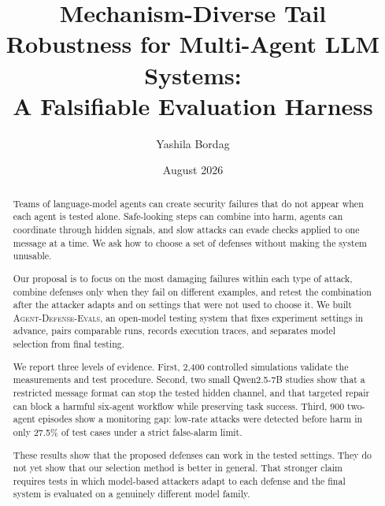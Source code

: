 \documentclass[10pt]{article}
\title{Mechanism-Diverse Tail Robustness for Multi-Agent LLM Systems:\\
A Falsifiable Evaluation Harness}
\author{Yashila Bordag}
\date{August 2026}
\newcommand{\system}{\textsc{Agent-Defense-Evals}}
\begin{document}
\maketitle

\begin{abstract}
Teams of language-model agents can create security failures that do not appear when each agent is tested alone. Safe-looking steps can combine into harm, agents can coordinate through hidden signals, and slow attacks can evade checks applied to one message at a time. We ask how to choose a set of defenses without making the system unusable.

Our proposal is to focus on the most damaging failures within each type of attack, combine defenses only when they fail on different examples, and retest the combination after the attacker adapts and on settings that were not used to choose it. We built \system{}, an open-model testing system that fixes experiment settings in advance, pairs comparable runs, records execution traces, and separates model selection from final testing.

We report three levels of evidence. First, 2,400 controlled simulations validate the measurements and test procedure. Second, two small Qwen2.5-7B studies show that a restricted message format can stop the tested hidden channel, and that targeted repair can block a harmful six-agent workflow while preserving task success. Third, 900 two-agent episodes show a monitoring gap: low-rate attacks were detected before harm in only 27.5\% of test cases under a strict false-alarm limit.

These results show that the proposed defenses can work in the tested settings. They do not yet show that our selection method is better in general. That stronger claim requires tests in which model-based attackers adapt to each defense and the final system is evaluated on a genuinely different model family.
\end{abstract}

\clearpage
\end{document}
